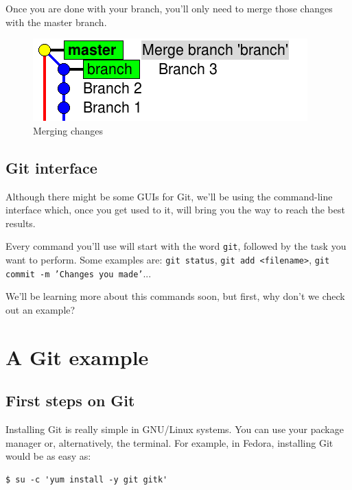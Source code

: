 \documentclass[a4paper,10pt]{article}
\newenvironment{terminal}
  {
    \vspace{+10pt}
    \begin{center}
    \begin{minipage}{0.95\textwidth}
    \begin{framed}
  }
  {
    \end{framed}
    \end{minipage}
    \end{center}
    \vspace{+10pt}
  }
\begin{document}
Once you are done with your branch, you'll only need to merge those
changes with the master branch.

\begin{figure}[h]
  \begin{center}
    \includegraphics[scale=0.5]{branching-04}
  \end{center}
  \caption{Merging changes}
\end{figure}

\subsection{Git interface}

Although there might be some GUIs for Git, we'll be using the
command-line interface which, once you get used to it, will bring you
the way to reach the best results.

Every command you'll use will start with the word \texttt{git}, followed
by the task you want to perform. Some examples are:
\texttt{git status},
\texttt{git add <filename>},
\texttt{git commit -m 'Changes you made'}...

We'll be learning more about this commands soon, but first, why don't we
check out an example?

\section{A Git example}

\subsection{First steps on Git}

Installing Git is really simple in GNU/Linux systems. You can use your
package manager or, alternatively, the terminal. For example, in
Fedora, installing Git would be as easy as:

\begin{terminal}
\begin{verbatim}
$ su -c 'yum install -y git gitk'
\end{verbatim}%
\end{terminal}
\end{document}
